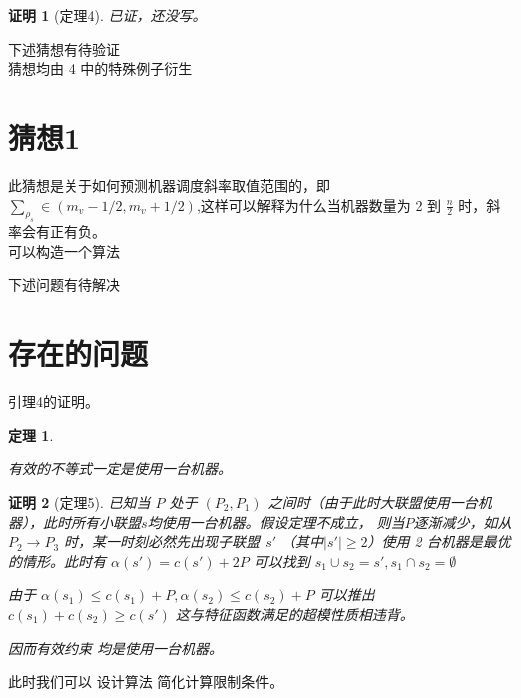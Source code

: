 \documentclass[UTF8]{article}
\newtheorem{thm}{\hspace{2em}定理}
\newtheorem{pf}{\hspace{2em}证明}
\begin{document}
\begin{pf}[定理4]

已证，还没写。
\end{pf}


下述猜想有待验证   \\
猜想均由 4 中的特殊例子衍生
\section*{猜想1}
此猜想是关于如何预测机器调度斜率取值范围的，即
$\sum_{\rho_s} \in (m_v-1/2,m_v+1/2)$,这样可以解释为什么当机器数量为 2 到 $\frac{n}{2}$ 时，斜率会有正有负。\\

可以构造一个算法

下述问题有待解决
\section{存在的问题}


引理4的证明。

\begin{thm}\label{thm5}

有效的不等式一定是使用一台机器。%

\end{thm}

\begin{pf}[定理5]

已知当 $P$ 处于 $(P_2,P_1)$ 之间时（由于此时大联盟使用一台机器），此时所有小联盟$ s$均使用一台机器。假设定理不成立，
则当$P$逐渐减少，如从$ P_2 \to P_3$ 时，某一时刻必然先出现子联盟 $s'$ （其中$|s'| \geq 2 $）使用 2 台机器是最优的情形。此时有
$ \alpha(s') = c(s') +2P $  可以找到 $ s_1 \cup s_2 = s',s_1 \cap s_2 = \emptyset $

由于 $\alpha(s_1) \leq c(s_1) + P , \alpha(s_2) \leq c(s_2) + P $
可以推出 $ c(s_1) + c(s_2) \geq c(s') $  这与特征函数满足的超模性质相违背。

因而有效约束 均是使用一台机器。

\end{pf}

此时我们可以 设计算法 简化计算限制条件。
\end{document}
